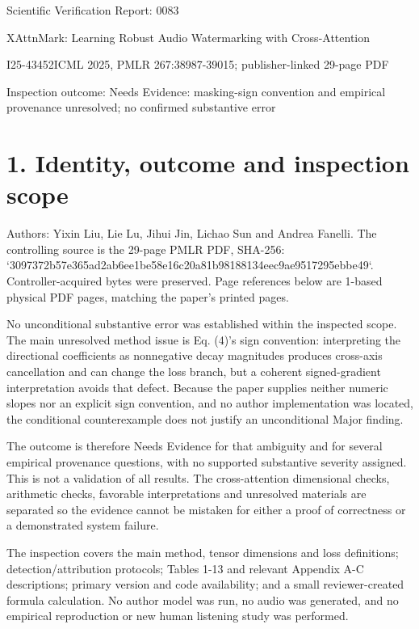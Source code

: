 \documentclass[10pt]{article}
\begin{document}
Scientific Verification Report: 0083\par
XAttnMark: Learning Robust Audio Watermarking with Cross-Attention\par
I25-43452ICML 2025, PMLR 267:38987-39015; publisher-linked 29-page PDF\par
Inspection outcome: Needs Evidence: masking-sign convention and empirical provenance unresolved; no confirmed substantive error\par
\section*{1. Identity, outcome and inspection scope}
Authors: Yixin Liu, Lie Lu, Jihui Jin, Lichao Sun and Andrea Fanelli. The controlling source is the 29-page PMLR PDF, SHA-256: `3097372b57e365ad2ab6ee1be58e16c20a81b98188134eec9ae9517295ebbe49`. Controller-acquired bytes were preserved. Page references below are 1-based physical PDF pages, matching the paper’s printed pages.\par
No unconditional substantive error was established within the inspected scope. The main unresolved method issue is Eq. (4)’s sign convention: interpreting the directional coefficients as nonnegative decay magnitudes produces cross-axis cancellation and can change the loss branch, but a coherent signed-gradient interpretation avoids that defect. Because the paper supplies neither numeric slopes nor an explicit sign convention, and no author implementation was located, the conditional counterexample does not justify an unconditional Major finding.\par
The outcome is therefore Needs Evidence for that ambiguity and for several empirical provenance questions, with no supported substantive severity assigned. This is not a validation of all results. The cross-attention dimensional checks, arithmetic checks, favorable interpretations and unresolved materials are separated so the evidence cannot be mistaken for either a proof of correctness or a demonstrated system failure.\par
The inspection covers the main method, tensor dimensions and loss definitions; detection/attribution protocols; Tables 1-13 and relevant Appendix A-C descriptions; primary version and code availability; and a small reviewer-created formula calculation. No author model was run, no audio was generated, and no empirical reproduction or new human listening study was performed.\par
\end{document}
